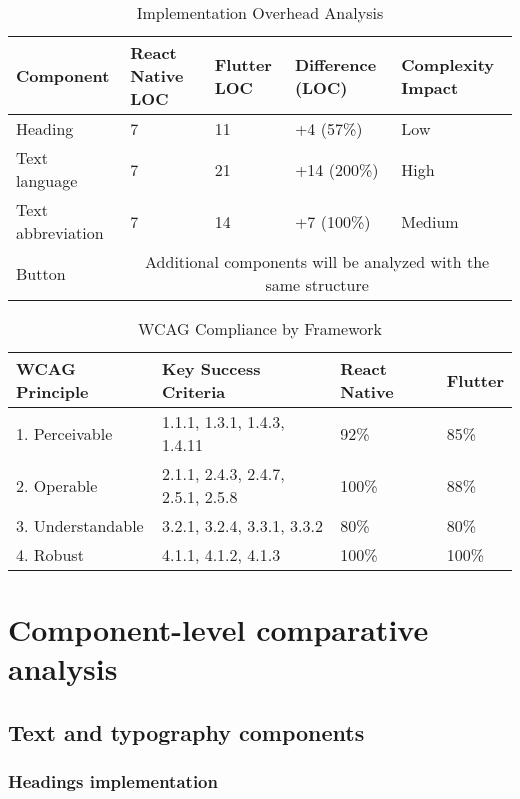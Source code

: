 \begin{table}[ht]
\caption{Implementation Overhead Analysis}
\label{tab:implementation_overhead_comparison}
\centering
\begin{tabular}{|p{2.5cm}|p{2.5cm}|p{2.5cm}|p{2.5cm}|p{2.5cm}|}
\hline
\textbf{Component} & \textbf{React Native LOC} & \textbf{Flutter LOC} & \textbf{Difference (LOC)} & \textbf{Complexity Impact} \\
\hline
Heading & 7 & 11 & +4 (57\%) & Low \\
\hline
Text language & 7 & 21 & +14 (200\%) & High \\
\hline
Text abbreviation & 7 & 14 & +7 (100\%) & Medium \\
\hline
Button & \multicolumn{4}{c|}{Additional components will be analyzed with the same structure} \\
\hline
\end{tabular}
\end{table}

\begin{table}[ht]
\caption{WCAG Compliance by Framework}
\label{tab:wcag_compliance_comparison}
\centering
\begin{tabular}{|p{2.5cm}|p{5cm}|p{3cm}|p{3cm}|}
\hline
\textbf{WCAG Principle} & \textbf{Key Success Criteria} & \textbf{React Native} & \textbf{Flutter} \\
\hline
1. Perceivable & 1.1.1, 1.3.1, 1.4.3, 1.4.11 & 92\% & 85\% \\
\hline
2. Operable & 2.1.1, 2.4.3, 2.4.7, 2.5.1, 2.5.8 & 100\% & 88\% \\
\hline
3. Understandable & 3.2.1, 3.2.4, 3.3.1, 3.3.2 & 80\% & 80\% \\
\hline
4. Robust & 4.1.1, 4.1.2, 4.1.3 & 100\% & 100\% \\
\hline
\end{tabular}
\end{table}

\section{Component-level comparative analysis}

\subsection{Text and typography components}

\subsubsection{Headings implementation}


